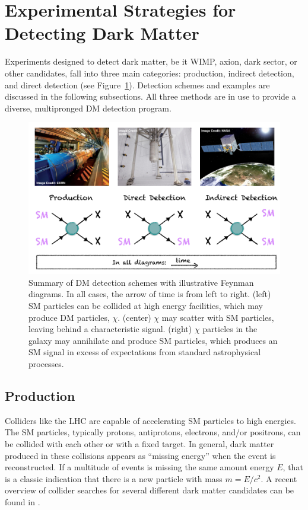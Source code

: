 \section{Experimental Strategies for Detecting Dark Matter}
\label{sec:dm_detection_schemes}
Experiments designed to detect dark matter, be it \ac{WIMP}, axion, dark sector, or other candidates, fall into three main categories: production, indirect detection, and direct detection (see Figure~\ref{fig:dm_detection_schemes}). Detection schemes and examples are discussed in the following subsections. All three methods are in use to provide a diverse, multipronged \ac{DM} detection program. 

\begin{figure}[htbp]
\begin{center}
\includegraphics[width=\textwidth]{figures/theory/dm_detection_schemes.png}
\caption{Summary of \acs{DM} detection schemes with illustrative Feynman diagrams. In all cases, the arrow of time is from left to right. (left) \acs{SM} particles can be collided at high energy facilities, which may produce \acs{DM} particles, $\chi$. (center) $\chi$ may scatter with \acs{SM} particles, leaving behind a characteristic signal. (right) $\chi$ particles in the galaxy may annihilate and produce \acs{SM} particles, which produces an \acs{SM} signal in excess of expectations from standard astrophysical processes.}
\label{fig:dm_detection_schemes}
\end{center}
\end{figure}

\subsection{Production}
Colliders like the \ac{LHC} are capable of accelerating \ac{SM} particles to high energies. The \ac{SM} particles, typically protons, antiprotons, electrons, and/or positrons, can be collided with each other or with a fixed target. In general, dark matter produced in these collisions appears as ``missing energy'' when the event is reconstructed. If a multitude of events is missing the same amount energy $E$, that is a classic indication that there is a new particle with mass $m = E/c^{2}$. A recent overview of collider searches for several different dark matter candidates can be found in \cite{Penning2018}. 

